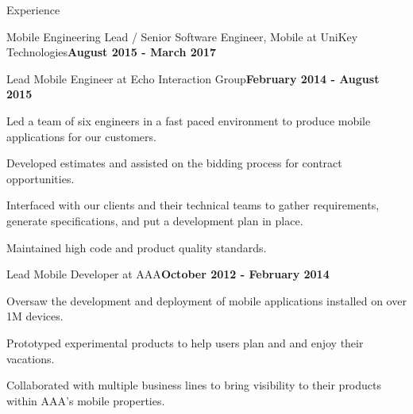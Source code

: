 \documentclass{resume} %
\begin{document}
\begin{rSection}{Experience}
\begin{rSubsection}{Mobile Engineering Lead / Senior Software Engineer, Mobile at UniKey Technologies}{\bf August 2015 - March 2017}{}{}
\end{rSubsection}


\begin{rSubsection}{Lead Mobile Engineer at Echo Interaction Group}{\bf February 2014 - August 2015}{}{}

\item Led a team of six engineers in a fast paced environment to produce mobile applications for our customers.
\item Developed estimates and assisted on the bidding process for contract opportunities.
\item Interfaced with our clients and their technical teams to gather requirements, generate specifications, and put a development plan in place.
\item Maintained high code and product quality standards.


\end{rSubsection}


\begin{rSubsection}{Lead Mobile Developer at AAA}{\bf October 2012 - February 2014}{}{}

\item Oversaw the development and deployment of mobile applications installed on over 1M devices.
\item Prototyped experimental products to help users plan and and enjoy their vacations.
\item Collaborated with multiple business lines to bring visibility to their products within AAA's mobile properties.

\end{rSubsection}


\end{rSection}

\end{document}
